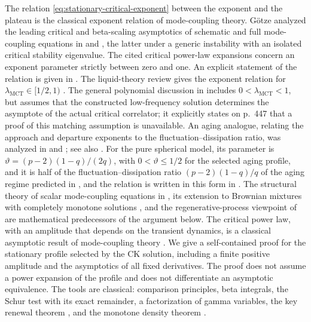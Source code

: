 The relation \eqref{eq:stationary-critical-exponent} between the exponent and the plateau is the classical exponent relation of mode-coupling theory. G\"otze analyzed the leading critical and beta-scaling asymptotics of schematic and full mode-coupling equations in \cite[p.~144, Equation~(11)]{goetze1984} and \cite[p.~195, Equation~(1b), and Sections~3 and~5]{goetze1985}, the latter under a generic instability with an isolated critical stability eigenvalue. The cited critical power-law expansions concern an exponent parameter strictly between zero and one. An explicit statement of the relation is given in \cite[Section~4, p.~881, paragraph following Equation~(6)]{goetze1998}. The liquid-theory review gives the exponent relation for $\lambda_{\mathrm{MCT}}\in[1/2,1)$ \cite[Section~3.3, Equation~(3.19), p.~306]{goetzesjogren1992}. The general polynomial discussion in \cite[Section~6.1.2, Equations~(6.11d) and~(6.17b), pp.~444--447]{goetze2009} includes $0<\lambda_{\mathrm{MCT}}<1$, but assumes that the constructed low-frequency solution determines the asymptote of the actual critical correlator; it explicitly states on p.~447 that a proof of this matching assumption is unavailable.
An aging analogue, relating the approach and departure exponents to the fluctuation--dissipation ratio, was analyzed in \cite[arXiv version~1, Sections~III and~VI.D--E]{cugliandololedoussal1996} and \cite[Section~IV, Equation~(IV.6)]{bckm1996}; see also \cite[arXiv version~2, Section~12.3.8, Equation~(12.36)]{cugliandolo2004}. For the pure spherical model, its parameter is $\vartheta=(p-2)(1-q)/(2q)$, with $0<\vartheta\le1/2$ for the selected aging profile, and it is half of the fluctuation--dissipation ratio $(p-2)(1-q)/q$ of the aging regime predicted in \cite[arXiv version~1, paragraph after Equation~(12), p.~6]{ck1993}, and the relation is written in this form in \cite[arXiv version~1, p.~4, paragraph following Equation~(12)]{kimlatz2001}. The structural theory of scalar mode-coupling equations in \cite[Section~2, Theorem~1 and Corollaries~1.1--1.2, pp.~232--233]{gs1995}, its extension to Brownian mixtures with completely monotone solutions \cite[arXiv version~1, Section~III]{fv2002}, and the regenerative-process viewpoint of \cite[Sections~1 and~5.2 and Appendix~C]{sjogren2003} are mathematical predecessors of the argument below. The critical power law, with an amplitude that depends on the transient dynamics, is a classical asymptotic result of mode-coupling theory \cite[Section~4, Equation~(6), pp.~880--881]{goetze1998}. We give a self-contained proof for the stationary profile selected by the CK solution, including a finite positive amplitude and the asymptotics of all fixed derivatives. The proof does not assume a power expansion of the profile and does not differentiate an asymptotic equivalence. The tools are classical: comparison principles, beta integrals, the Schur test with its exact remainder, a factorization of gamma variables, the key renewal theorem \cite{feller1971}, and the monotone density theorem \cite{bgt1987}.

